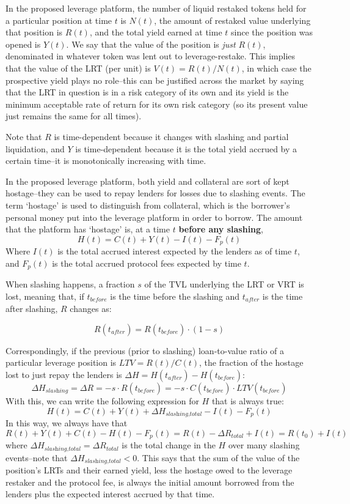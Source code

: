 \documentclass{article}
\begin{document}
In the proposed leverage platform, the number of liquid restaked tokens held for a particular position at time $t$ is $N(t)$, the amount of restaked value underlying that position is $R(t)$, and the total yield earned at time $t$ since the position was opened is $Y(t)$. We say that the value of the position is \textit{just} $R(t)$, denominated in whatever token was lent out to leverage-restake. This implies that the value of the LRT (per unit) is $V(t) = R(t)/N(t)$, in which case the prospective yield plays no role--this can be justified across the market by saying that the LRT in question is in a risk category of its own and its yield is the minimum acceptable rate of return for its own risk category (so its present value just remains the same for all times).

Note that $R$ is time-dependent because it changes with slashing and partial liquidation, and $Y$ is time-dependent because it is the total yield accrued by a certain time--it is monotonically increasing with time.

In the proposed leverage platform, both yield and collateral are sort of kept hostage--they can be used to repay lenders for losses due to slashing events. The term `hostage' is used to distinguish from collateral, which is the borrower's personal money put into the leverage platform in order to borrow. The amount that the platform has `hostage' is, at a time $t$ \textbf{before any slashing},
$$
H(t) = C(t) + Y(t) - I(t) - F_p(t)
$$
Where $I(t)$ is the total accrued interest expected by the lenders as of time $t$, and $F_p(t)$ is the total accrued protocol fees expected by time $t$.

When slashing happens, a fraction $s$ of the TVL underlying the LRT or VRT is lost, meaning that, if $t_{\textit{before}}$ is the time before the slashing and $t_\textit{after}$ is the time after slashing, $R$ changes as:

$$
R(t_\textit{after}) = R(t_\textit{before})\cdot(1-s)
$$

Correspondingly, if the previous (prior to slashing) loan-to-value ratio of a particular leverage position is $\textit{LTV} = R(t)/C(t)$, the fraction of the hostage lost to just repay the lenders is $\Delta H =  H(t_\textit{after}) - H(t_\textit{before})$:
$$
\Delta H_\textit{slashing}  = \Delta R = - s\cdot R(t_\textit{before}) = -s\cdot C(t_\textit{before})\cdot \textit{LTV}(t_\textit{before})
$$
With this, we can write the following expression for $H$ that is always true:
$$
H(t) = C(t) + Y(t) + \Delta H_\textit{slashing,total} - I(t) - F_p(t)
$$
In this way, we always have that 
$$R(t) + Y(t) + C(t) - H(t) - F_p(t) = R(t) - \Delta R_\textit{total} + I(t)= R(t_0) + I(t)$$ where $\Delta H_\textit{slashing,total} = \Delta R_\textit{total}$ is the total change in the $H$ over many slashing events--note that $\Delta H_\textit{slashing,total} < 0$. This says that the sum of the value of the position's LRTs and their earned yield, less the hostage owed to the leverage restaker and the protocol fee, is always the initial amount borrowed from the lenders plus the expected interest accrued by that time.
\end{document}
